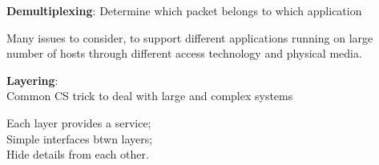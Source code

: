 \begin{cf}{
\textbf{Demultiplexing}: Determine which packet belongs to which application
}
\end{cf}

\begin{frame}\begin{center}\normalsize
Many issues to consider, to support different applications running on large number of hosts through different access technology and physical media.
\end{center}\end{frame}

\begin{frame}[plain]
\end{frame}

\begin{frame}\begin{center}\large
\textbf{Layering}:\\Common CS trick to deal with large and complex systems
\end{center}\end{frame}

\begin{frame}\begin{center}\large
Each layer provides a service;\\ Simple interfaces btwn layers;\\ Hide details from each other.
\end{center}\end{frame}

